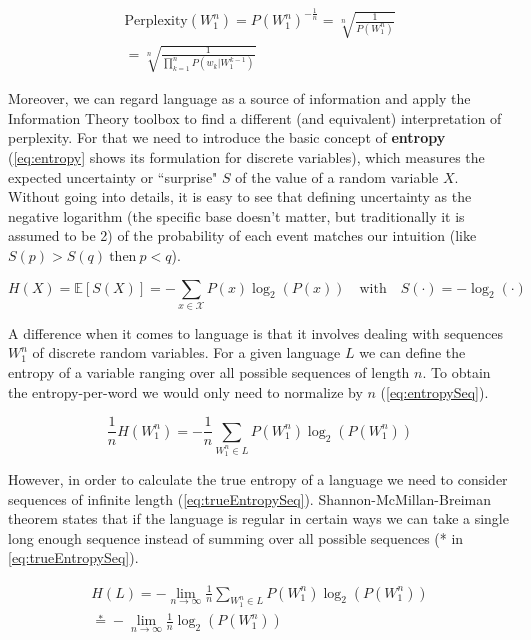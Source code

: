 \begin{equation} \label{eq:pp}
	\begin{gathered}
		\text{Perplexity}(W_1^n) = P(W_1^n)^{-\frac{1}{n}} = \sqrt[n]{\frac{1}{P(W_1^n)}} \\
		= \sqrt[n]{\frac{1}{\prod_{k=1}^{n} P(w_k|W_{1}^{k-1})}}
	\end{gathered}
\end{equation}

Moreover, we can regard language as a source of information and apply the Information Theory toolbox to find a different (and equivalent) interpretation of perplexity. For that we need to introduce the basic concept of \textbf{entropy} (\autoref{eq:entropy} shows its formulation for discrete variables), which measures the expected uncertainty or ``surprise" $S$ of the value of a random variable $X$. Without going into details, it is easy to see that defining uncertainty as the negative logarithm (the specific base doesn't matter, but traditionally it is assumed to be 2) of the probability of each event matches our intuition (like $S(p)>S(q) \ \text{then} \ p<q$).

\begin{equation} \label{eq:entropy}
	H(X)=\mathbb{E}[S(X)]=-\sum_{x \in \mathcal{X}}P(x)\log_2(P(x)) \quad \text{with} \quad S(\cdot)=-\log_2(\cdot)
\end{equation}

A difference when it comes to language is that it involves dealing with sequences $W_1^n$ of discrete random variables. For a given language $L$ we can define the entropy of a variable ranging over all possible sequences of length $n$. To obtain the entropy-per-word we would only need to normalize by $n$ (\autoref{eq:entropySeq}).

\begin{equation} \label{eq:entropySeq}
	\frac{1}{n} H(W_1^n) = -\frac{1}{n}\sum_{W_1^n \in L}P(W_1^n)\log_2(P(W_1^n))
\end{equation}

However, in order to calculate the true entropy of a language we need to consider sequences of infinite length (\autoref{eq:trueEntropySeq}). Shannon-McMillan-Breiman theorem states that if the language is regular in certain ways we can take a single long enough sequence instead of summing over all possible sequences (* in \autoref{eq:trueEntropySeq}).

\begin{equation} \label{eq:trueEntropySeq}
	\begin{gathered}
		H(L) = -\lim\limits_{n \rightarrow \infty}\frac{1}{n}\sum_{W_1^n \in L}P(W_1^n)\log_2(P(W_1^n))\\
		\stackrel{*}{=} -\lim\limits_{n \rightarrow \infty}\frac{1}{n}\log_2(P(W_1^n))
	\end{gathered}
\end{equation}

